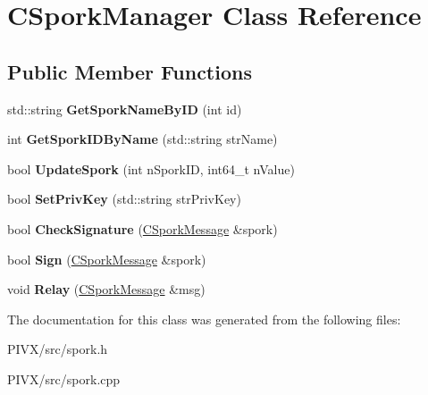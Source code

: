 \hypertarget{class_c_spork_manager}{}\section{C\+Spork\+Manager Class Reference}
\label{class_c_spork_manager}
\subsection*{Public Member Functions}
\begin{DoxyCompactItemize}
\item 
\mbox{\label{class_c_spork_manager_a1a2960fa69bc49f5e4d36db583d4a840}} 
std\+::string {\bfseries Get\+Spork\+Name\+By\+ID} (int id)
\item 
\mbox{\label{class_c_spork_manager_ae72689cf7a2e87ef57f8f7e875a5c21d}} 
int {\bfseries Get\+Spork\+I\+D\+By\+Name} (std\+::string str\+Name)
\item 
\mbox{\label{class_c_spork_manager_afb7e15fe29bd548939657a20ca5feafb}} 
bool {\bfseries Update\+Spork} (int n\+Spork\+ID, int64\+\_\+t n\+Value)
\item 
\mbox{\label{class_c_spork_manager_a599d088218de9d242e4dc5cb17dd310b}} 
bool {\bfseries Set\+Priv\+Key} (std\+::string str\+Priv\+Key)
\item 
\mbox{\label{class_c_spork_manager_a697d8c0ce5c422ea125eee96687aa7b3}} 
bool {\bfseries Check\+Signature} (\mbox{\hyperlink{class_c_spork_message}{C\+Spork\+Message}} \&spork)
\item 
\mbox{\label{class_c_spork_manager_adf1b5d40f378c4bd3a5ea31905b11f30}} 
bool {\bfseries Sign} (\mbox{\hyperlink{class_c_spork_message}{C\+Spork\+Message}} \&spork)
\item 
\mbox{\label{class_c_spork_manager_ae8651894670c02ecb5f99806376d5af2}} 
void {\bfseries Relay} (\mbox{\hyperlink{class_c_spork_message}{C\+Spork\+Message}} \&msg)
\end{DoxyCompactItemize}


The documentation for this class was generated from the following files\+:\begin{DoxyCompactItemize}
\item 
P\+I\+V\+X/src/spork.\+h\item 
P\+I\+V\+X/src/spork.\+cpp\end{DoxyCompactItemize}
